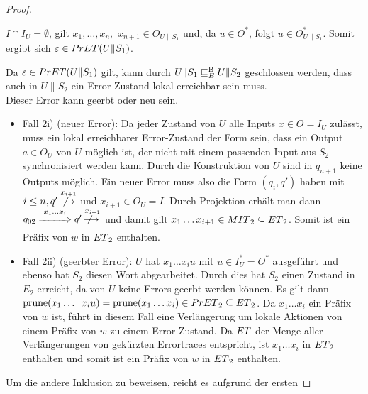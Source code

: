 \begin{proof}
\begin{itemize}
\begin{itemize}
          $I\cap I_U = \emptyset$, gilt
          $x_1,\dots ,x_n,$ $x_{n+1}\in O_{U\|S_1}$ und, da $u\in O^*$, folgt
          $u\in O_{U\|S_1}^*$. Somit ergibt sich $\varepsilon\in
          PrET{}(U\|S_1)$.
      \end{itemize}
      Da $\varepsilon\in PrET{}(U\|S_1)$ gilt, kann durch
      $U\|S_1\sqsubseteq _E^\mathrm{B} U\|S_2$ geschlossen werden, dass auch in $U\|S_2$ ein
      Error-Zustand lokal erreichbar sein muss.\\
      Dieser Error kann geerbt oder neu sein.
      \begin{itemize}
        \item Fall 2i) (neuer Error): Da jeder Zustand von $U$ alle Inputs $x\in
          O=I_U$ zulässt, muss ein lokal erreichbarer Error-Zustand der Form sein, dass
          ein Output $a\in O_U$ von $U$ möglich ist, der nicht mit einem
          passenden Input aus $S_2$ synchronisiert werden kann. Durch die
          Konstruktion von $U$ sind in $q_{n+1}$ keine Outputs möglich. Ein
          neuer Error muss also die Form $(q_i,q')$ haben mit $i\leq n, q'
          \overset{x_{i+1}}{\not{\hspace{-0.2cm}\longrightarrow}}$ und $x_{i+1}\in
          O_U=I$. Durch Projektion erhält man dann $q_{02} \overset{x_1\dots
          x_i}{\xRightarrow{\hspace{0.9cm}}} q'
          \overset{x_{i+1}}{\not{\hspace{-0.2cm}\longrightarrow}}$ und damit gilt
          $x_1\dots x_{i+1}\in MIT{}_2\subseteq ET{}_2$. Somit ist ein Präfix
          von $w$ in $ET{}_2$ enthalten.
        \item Fall 2ii) (geerbter Error): $U$ hat $x_1\dots x_i u$
          mit $u\in I_U^*=O^*$ ausgeführt und ebenso hat $S_2$ diesen Wort
          abgearbeitet.
          Durch dies hat $S_2$ einen Zustand in $E_2$ erreicht, da von $U$
          keine Errors geerbt werden können. Es gilt dann $\mathrm{prune}{}(x_1\dots$
          $x_iu)=\mathrm{prune}{}(x_1\dots x_i)\in PrET{}_2\subseteq ET{}_2$. Da
          $x_1\dots x_i$ ein Präfix von $w$ ist, führt in diesem
          Fall eine Verlängerung um lokale Aktionen von einem
          Präfix von $w$ zu einem Error-Zustand. Da $ET$ der Menge aller
          Verlängerungen von gekürzten Errortraces entspricht, ist $x_1\dots x_i$ in
          $ET{}_2$ enthalten und somit ist ein Präfix von $w$ in $ET{}_2$
          enthalten.
      \end{itemize}
  \end{itemize}
  Um die andere Inklusion zu beweisen, reicht es aufgrund der ersten

\end{proof}
